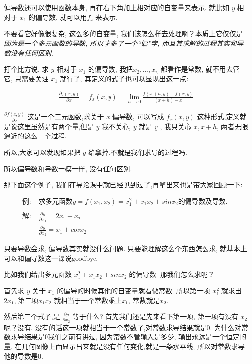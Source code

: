 偏导数还可以使用函数本身, 再在右下角加上相对应的自变量来表示. 就比如 $y$ 相对于 $x_1$ 的偏导数, 就可以用$f_{x_1}$来表示. 

不要看它好像很复杂, 这么多的自变量, 我们该怎么样去处理啊？本质上它仅仅是\textit{因为是一个多元函数的导数, 所以才多了一个“偏”字, 而且其求解的过程其实和导数没有任何区别}. 

打个比方说, 求 $y$ 相对于 $x_1$ 的偏导数, 我把$x_2, ..., x_n$ 都看作是常数, 就不用去管它, 只需要关注 $x_1$ 就行了, 其定义的式子也可以显现出这一点: 

\begin{align*}
  \frac{\partial f(x, y)}{\partial x}  = f_x(x, y) = \lim_{h \to 0} \frac{f(x+h, y) - f(x, y)}{(x+h)-x}
\end{align*}

$\frac{\partial f(x, y)}{\partial x}$ 这是一个二元函数,求关于 $x$ 偏导数, 可以写成 $f_x(x, y)$ 这种形式,定义就是说这里虽然是有两个量,但是 $y$ 我不关心, $y$ 就是 $y$ , 我只关心 $x, x+h$, 两者无限逼近的这么一个过程. 

所以,大家可以发现如果把 $y$ 给拿掉,不就是我们求导的过程吗. 

所以偏导数和导数一模一样, 没有任何区别. 

那下面这个例子, 我们在导论课中就已经见到过了,再拿出来也是带大家回顾一下:

\begin{align*}
  \mbox{例: } & \mbox{求多元函数} y = f(x_1, x_2) = x_1^2 + x_1x_2+sinx_2\mbox{的偏导数及导数. }\\ \\
  \mbox{解:  }& \frac{\partial y}{\partial x_1} = 2x_1 + x_2 \\
  & \frac{\partial y}{\partial x_2} = x_1 + cos x_2
\end{align*}

只要导数会求, 偏导数其实就没什么问题. 只要能理解这么个东西怎么求, 就基本上可以和偏导数这一课说goodbye. 

比如我们给出多元函数 $x_1^2 + x_1x_2+sinx_2$ 的偏导数. 那我们怎么求呢？

首先求 $y$ 关于 $x_1$ 的偏导的时候其他的自变量就看做常数, 所以第一项 $x_1^2$ 就求出 $2x_1$, 第二项$x_1x_2$ 就相当于一个常数乘上$x_1$, 常数就是$x_2$. 

然后第二个式子,是 $\frac{\partial y}{\partial x_2}$ 等于什么? 首先我们还是先来看下第一项, 第一项有没有 $x_2$ 呢？没有. 没有的话这一项就相当于一个常数了,对常数求导结果就是0. 为什么对常数求导结果是0我们之前有讲过, 因为常数不管输入是多少, 输出永远是一个恒定的量, 在几何图像上面显示出来就是没有任何变化,就是一条水平线, 所以对常数求导他的导数是0. 

